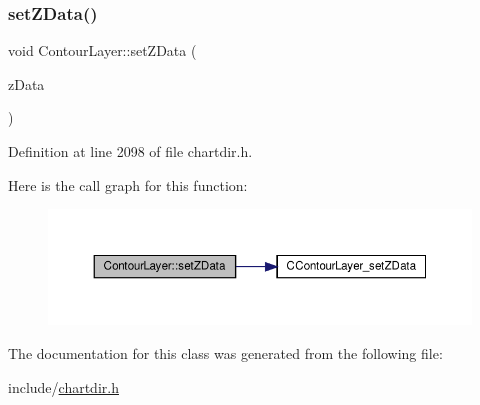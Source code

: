 \subsubsection{\texorpdfstring{set\+Z\+Data()}{setZData()}}
{\footnotesize\ttfamily void Contour\+Layer\+::set\+Z\+Data (\begin{DoxyParamCaption}\item[{\hyperlink{class_double_array}{Double\+Array}}]{z\+Data }\end{DoxyParamCaption})\hspace{0.3cm}{\ttfamily [inline]}}



Definition at line 2098 of file chartdir.\+h.

Here is the call graph for this function\+:
\nopagebreak
\begin{figure}[H]
\begin{center}
\leavevmode
\includegraphics[width=350pt]{class_contour_layer_a8588a9186e0790c8981284879602ba2c_cgraph}
\end{center}
\end{figure}


The documentation for this class was generated from the following file\+:\begin{DoxyCompactItemize}
\item 
include/\hyperlink{chartdir_8h}{chartdir.\+h}\end{DoxyCompactItemize}
